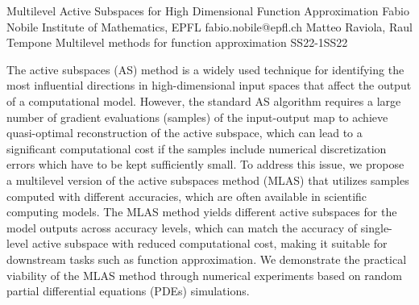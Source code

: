 \begin{talk}
  {Multilevel Active Subspaces for High Dimensional Function Approximation}%
  {Fabio Nobile}%
  {Institute of Mathematics, EPFL}%
  {fabio.nobile@epfl.ch}%
  {Matteo Raviola, Raul Tempone}%
{Multilevel methods for function approximation}
{}{SS22-1}{SS22}


				
The active subspaces (AS) method is a widely used technique for identifying the most influential directions in high-dimensional input spaces that affect the output of a computational model. However, the standard AS algorithm requires a large number of gradient evaluations (samples) of the input-output map to achieve quasi-optimal reconstruction of the active subspace, which can lead to a significant computational cost if the samples include numerical discretization errors which have to be kept sufficiently small. To address this issue, we propose a multilevel version of the active subspaces method (MLAS) that utilizes samples computed with different accuracies, which are often available in scientific computing models. The MLAS method yields different active subspaces for the model outputs across accuracy levels, which can match the accuracy of single-level active subspace with reduced computational cost, making it suitable for downstream tasks such as function approximation. We demonstrate the practical viability of the MLAS method through numerical experiments based on random partial differential equations (PDEs) simulations. 				


\end{talk}

